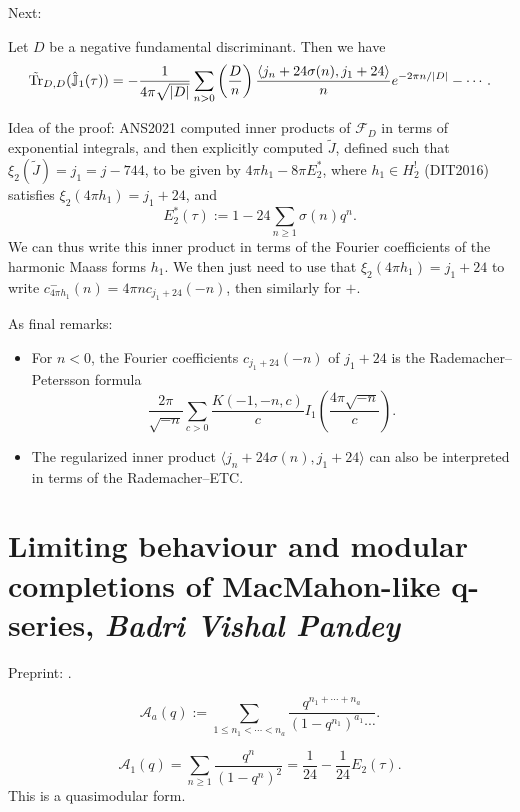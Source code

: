 \documentclass[reqno]{amsart} 
\begin{document}
Next:
\begin{corollary}
  Let $D$ be a negative fundamental discriminant.  Then we have
  \begin{equation*}
    \tilde{\operatorname{Tr}}_{D, D}(\hat{\mathbb{J}}_1(\tau))
    =
    - \frac{1}{4 \pi \sqrt{\lvert D \rvert}}
    \sum_{n > 0}
    \left( \frac{D}{n} \right)
    \frac{\langle j_n + 24 \sigma(n), j_1 + 24 \rangle}{n}
    e^{- 2 \pi n / \lvert D \rvert}
    - \dotsb.
  \end{equation*}
\end{corollary}
Idea of the proof: ANS2021 computed inner products of $\mathcal{F}_D$ in terms of exponential integrals, and then explicitly computed $\tilde{J}$, defined such that $\xi_2(\tilde{J}) = j_1 = j - 744$, to be given by $4 \pi h_1 - 8 \pi E_2^\ast$, where $h_1 \in H_2 ^!$ (DIT2016) satisfies $\xi_2(4 \pi h_1) = j_1 + 24$, and
\begin{equation*}
  E_2^\ast(\tau) := 1 - 24 \sum_{n \geq 1} \sigma(n) q^n.
\end{equation*}
We can thus write this inner product in terms of the Fourier coefficients of the harmonic Maass forms $h_1$.  We then just need to use that $\xi_2(4 \pi h_1) = j_1 + 24$ to write $c_{4 \pi h_1}^-(n) = 4 \pi n c_{j_1 + 24}(- n)$, then similarly for $+$.

As final remarks:
\begin{itemize}
\item For $n  < 0$, the Fourier coefficients $c_{j_1 + 24}(- n)$ of $j_1 + 24$ is the Rademacher--Petersson formula
  \begin{equation*}
    \frac{2 \pi}{ \sqrt{- n}}
    \sum_{c> 0}
    \frac{K(- 1, - n, c)}{c}
    I_1 \left( \frac{4 \pi \sqrt{- n}}{c} \right).
  \end{equation*}
\item   The regularized inner product $\langle j_n + 24 \sigma(n), j_1 + 24 \rangle$ can also be interpreted in terms of the Rademacher--ETC.
\end{itemize}


\section{Limiting behaviour and modular completions of MacMahon-like q-series, \textnormal{\emph{Badri Vishal Pandey}}}
Preprint: \cite{2024arXiv2402.08340}.

\begin{definition}
  \begin{equation*}
    \mathcal{A}_a(q) := \sum_{1 \leq n_1 < \dotsb < n_a}
    \frac{q^{n_1 + \dotsb + n_a}}{(1 - q^{n_1})^{a_1} \dotsb}.
  \end{equation*}
\end{definition}
\begin{example}
  \begin{equation*}
    \mathcal{A}_1(q) = \sum_{n \geq 1} \frac{q^n}{(1 - q^n)^{2}}
    = \frac{1}{24}
    - \frac{1}{24} E_2(\tau).
  \end{equation*}
  This is a quasimodular form.
\end{example}
\end{document}
